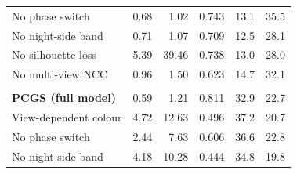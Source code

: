 \begin{table}[t]
\begin{tabular}{@{}lrrrrr@{}}
No phase switch & 0.68 & 1.02 & 0.743 & 13.1 & 35.5 \\
No night-side band & 0.71 & 1.07 & 0.709 & 12.5 & 28.1 \\
No silhouette loss & 5.39 & 39.46 & 0.738 & 13.0 & 28.0 \\
No multi-view NCC & 0.96 & 1.50 & 0.623 & 14.7 & 32.1 \\
\addlinespace[3pt]
\multicolumn{6}{@{}l}{\textit{Bennu, 26--60\textdegree{}}} \\
\textbf{PCGS (full model)} & 0.59 & 1.21 & 0.811 & 32.9 & 22.7 \\
View-dependent colour & 4.72 & 12.63 & 0.496 & 37.2 & 20.7 \\
No phase switch & 2.44 & 7.63 & 0.606 & 36.6 & 22.8 \\
No night-side band & 4.18 & 10.28 & 0.444 & 34.8 & 19.8 \\
\bottomrule
\end{tabular}
\end{table}
